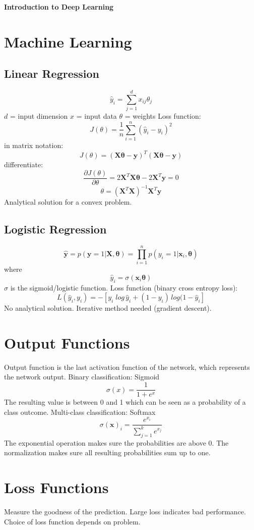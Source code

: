 \documentclass{scrartcl}
\begin{document}
\onehalfspacing
\obeylines
\setlength{\parindent}{0pt}
\begin{center}\LARGE\textbf{Introduction to Deep Learning}\end{center}


\section*{Machine Learning}
\subsection*{Linear Regression}
$$\hat{y}_i = \sum_{j=1}^{d} x_{ij} \theta_j$$
$d$ = input dimension
$x$ = input data
$\theta$ = weights
Loss function:
$$J(\theta) = \frac{1}{n} \sum_{i=1}^{n} (\hat{y}_i - y_i)^2$$
in matrix notation:
$$J(\theta) = (\mathbf{X\theta} - \mathbf{y})^T(\mathbf{X\theta} - \mathbf{y})$$
differentiate:
$$\frac{\partial J(\theta)}{\partial \theta} = 2\mathbf{X}^T\mathbf{X\theta} - 2\mathbf{X}^T\mathbf{y} = 0$$
$$\theta = (\mathbf{X}^T\mathbf{X})^{-1}\mathbf{X}^T\mathbf{y}$$
Analytical solution for a convex problem.

\subsection*{Logistic Regression}
$$\mathbf{\hat{y}} = p(\mathbf{y} = 1 | \mathbf{X}, \mathbf{\theta}) = \prod_{i=1}^{n} p(y_i = 1 | \mathbf{x}_i, \mathbf{\theta})$$
where
$$\hat{y}_i = \sigma(\mathbf{x}_i\mathbf{\theta})$$
$\sigma$ is the sigmoid/logistic function.
Loss function (binary cross entropy loss):
$$L(\hat{y}_i, y_i) = -[y_i \; log \, \hat{y}_i + (1 - y_i) \, log(1 - \hat{y}_i]$$
No analytical solution. Iterative method needed (gradient descent).


\section*{Output Functions}
Output function is the last activation function of the network, which represents the network output.
Binary classification: Sigmoid
$$\sigma (x) = \frac{1}{1 + e^{x}}$$
The resulting value is between 0 and 1 which can be seen as a probability of a class outcome.
Multi-class classification: Softmax
$$\sigma (\mathbf{x})_i = \frac{e^{x_i}}{\sum_{j=1}^{k} e^{x_j}}$$
The exponential operation makes sure the probabilities are above 0. The normalization makes sure all resulting probabilities sum up to one.


\section*{Loss Functions}
Measure the goodness of the prediction.
Large loss indicates bad performance.
Choice of loss function depends on problem.
\end{document}

